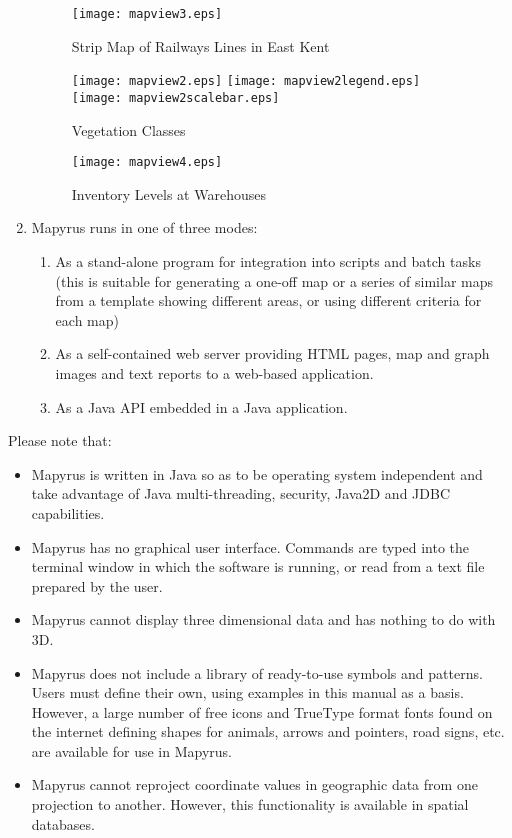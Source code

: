 \begin{enumerate}
\begin{figure}
\texttt{[image: mapview3.eps]}
\caption{Strip Map of Railways Lines in East Kent}
\label{mapview3}
\end{figure}

\begin{figure}
\texttt{[image: mapview2.eps]}
\texttt{[image: mapview2legend.eps]}
\vspace{1pt}
\texttt{[image: mapview2scalebar.eps]}
\caption{Vegetation Classes}
\label{mapview2}
\end{figure}

\begin{figure}
\texttt{[image: mapview4.eps]}
\caption{Inventory Levels at Warehouses}
\label{mapview4}
\end{figure}

\item
Mapyrus runs in one of three modes:

\begin{enumerate}
\item
As a stand-alone program for integration into
scripts and batch tasks  (this is suitable for generating a one-off
map or a series of similar maps from a template
showing different areas, or using different criteria for each map)

\item
As a self-contained web server providing HTML pages, map and
graph images and text reports to a web-based application.

\item
As a Java API embedded in a Java application.
\end{enumerate}


\end{enumerate}

Please note that:

\begin{itemize}
\item
Mapyrus is written in Java so as to be operating system independent
and take advantage of Java multi-threading, security,
Java2D and JDBC capabilities.

\item
Mapyrus has no graphical user interface.
Commands are typed into the terminal window in which the software is running,
or read from a text file prepared by the user.

\item
Mapyrus cannot display three dimensional data and has nothing to do
with 3D.

\item
Mapyrus does not include a library of ready-to-use symbols and patterns.
Users must define their own, using examples in this manual as a basis.
However, a large number of free icons
and TrueType format fonts found on the internet
defining shapes for animals, arrows and pointers, road signs, etc. are
available for use in Mapyrus.

\item
Mapyrus cannot reproject coordinate values in geographic data from
one projection to another.  However, this functionality
is available in spatial databases.
\end{itemize}

